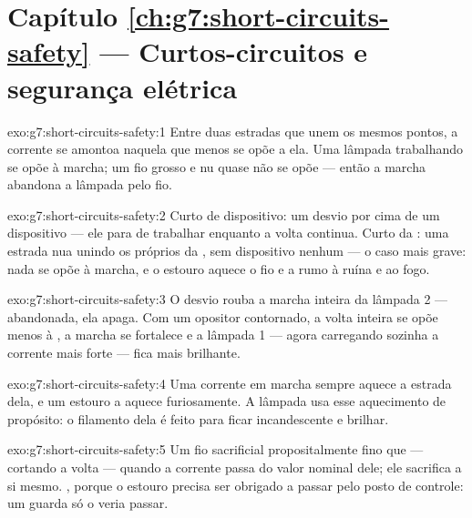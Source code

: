 \section*{Capítulo \ref{ch:g7:short-circuits-safety} --- Curtos-circuitos e segurança elétrica}

\begin{solution}{exo:g7:short-circuits-safety:1}
Entre duas estradas que unem os mesmos pontos, a corrente se amontoa
naquela que menos se opõe a ela. Uma lâmpada trabalhando se opõe à
marcha; um fio grosso e nu quase não se opõe --- então a marcha
abandona a lâmpada pelo fio.
\end{solution}

\begin{solution}{exo:g7:short-circuits-safety:2}
Curto de dispositivo: um desvio por cima de um dispositivo --- ele
para de trabalhar enquanto a volta continua. Curto da : uma
estrada nua unindo os próprios  da , sem dispositivo
nenhum --- o caso mais grave: nada se opõe à marcha, e o estouro
aquece o fio e a  rumo à ruína e ao fogo.
\end{solution}

\begin{solution}{exo:g7:short-circuits-safety:3}
O desvio rouba a marcha inteira da lâmpada 2 --- abandonada, ela
apaga. Com um opositor contornado, a volta inteira se opõe menos à
, a marcha se fortalece e a lâmpada 1 --- agora carregando
sozinha a corrente mais forte --- fica mais brilhante.
\end{solution}

\begin{solution}{exo:g7:short-circuits-safety:4}
Uma corrente em marcha sempre aquece a estrada dela, e um estouro a
aquece furiosamente. A lâmpada usa esse aquecimento de propósito: o
filamento dela é feito para ficar incandescente e brilhar.
\end{solution}

\begin{solution}{exo:g7:short-circuits-safety:5}
Um fio sacrificial propositalmente fino que  --- cortando a
volta --- quando a corrente passa do valor nominal dele; ele
sacrifica a si mesmo. , porque o estouro precisa ser obrigado
a passar pelo posto de controle: um guarda  só o veria
passar.
\end{solution}

